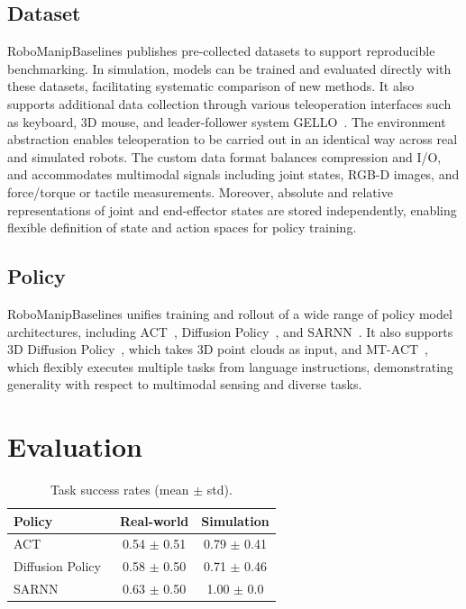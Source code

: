 \documentclass[letterpaper, 10 pt, conference]{ieeeconf}  %
\begin{document}
\subsection{Dataset}

RoboManipBaselines publishes pre-collected datasets to support reproducible benchmarking.
In simulation, models can be trained and evaluated directly with these datasets, facilitating systematic comparison of new methods.
It also supports additional data collection through various teleoperation interfaces such as keyboard, 3D mouse, and leader-follower system GELLO~\cite{GELLO:Wu:IROS2024}.
The environment abstraction enables teleoperation to be carried out in an identical way across real and simulated robots.
The custom data format balances compression and I/O, and accommodates multimodal signals including joint states, RGB-D images, and force/torque or tactile measurements.
Moreover, absolute and relative representations of joint and end-effector states are stored independently, enabling flexible definition of state and action spaces for policy training.

\subsection{Policy}

RoboManipBaselines unifies training and rollout of a wide range of policy model architectures, including ACT~\cite{ALOHA:Zhao:RSS2023}, Diffusion Policy~\cite{DiffusionPolicy:Chi:IJRR2024}, and SARNN~\cite{SARNN:Ichiwara:ICRA2022}.
It also supports 3D Diffusion Policy~\cite{3DDiffusionPolicy:Ze:RSS2024}, which takes 3D point clouds as input, and MT-ACT~\cite{MtAct:Bharadhwaj:ICRA2024}, which flexibly executes multiple tasks from language instructions, demonstrating generality with respect to multimodal sensing and diverse tasks.


\section{Evaluation}

\begin{table}[t]
  \centering
  \caption{Task success rates (mean $\pm$ std).}
  \label{tab:eval}
  \vspace{-2mm}
  \begin{tabular}{lcc}
    \toprule
    Policy & Real-world & Simulation \\
    \midrule
    ACT~\cite{ALOHA:Zhao:RSS2023} & 0.54 $\pm$ 0.51 & 0.79 $\pm$ 0.41 \\
    Diffusion Policy~\cite{DiffusionPolicy:Chi:IJRR2024} & 0.58 $\pm$ 0.50 & 0.71 $\pm$ 0.46 \\
    SARNN~\cite{SARNN:Ichiwara:ICRA2022} & 0.63 $\pm$ 0.50 & 1.00 $\pm$ 0.0 \\
    \bottomrule
  \end{tabular}
\end{table}
\end{document}
